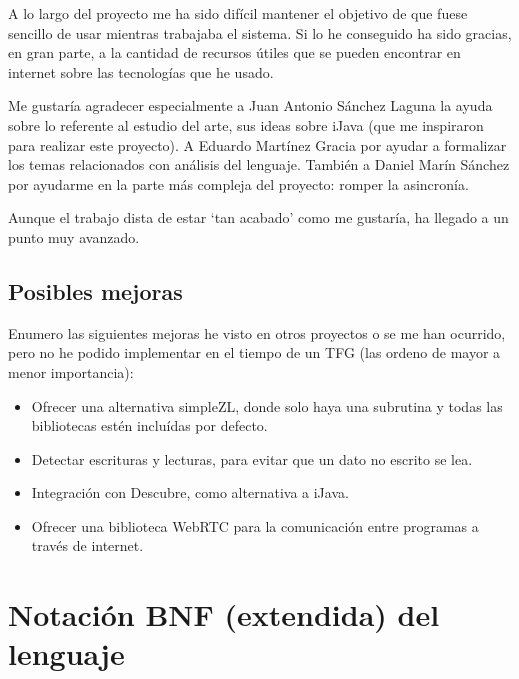 \documentclass{report}
\begin{document}
	\vspace{10px}
	
	A lo largo del proyecto me ha sido difícil mantener el objetivo de que fuese sencillo de usar mientras trabajaba el sistema. Si lo he conseguido ha sido gracias, en gran parte, a la cantidad de recursos útiles que se pueden encontrar en internet sobre las tecnologías que he usado.
	
	\vspace{10px}
	
	Me gustaría agradecer especialmente a Juan Antonio Sánchez Laguna la ayuda sobre lo referente al estudio del arte, sus ideas sobre iJava (que me inspiraron para realizar este proyecto). A Eduardo Martínez Gracia por ayudar a formalizar los temas relacionados con análisis del lenguaje. También a Daniel Marín Sánchez por ayudarme en la parte más compleja del proyecto: romper la asincronía.
	
	Aunque el trabajo dista de estar `tan acabado' como me gustaría, ha llegado a un punto muy avanzado.  
	
	\section{Posibles mejoras}
	
	Enumero las siguientes mejoras he visto en otros proyectos o se me han ocurrido, pero no he podido implementar en el tiempo de un TFG (las ordeno de mayor a menor importancia):
	
	\begin{itemize}
		\item Ofrecer una alternativa simpleZL, donde solo haya una subrutina y todas las bibliotecas estén incluídas por defecto.
		\item Detectar escrituras y lecturas, para evitar que un dato no escrito se lea.
		\item Integración con Descubre, como alternativa a iJava.
		\item Ofrecer una biblioteca WebRTC para la comunicación entre programas a través de internet.
		
	\end{itemize}
	
	
	
	

	\appendix
	\chapter{Notación BNF (extendida) del lenguaje} \label{app:a}
	
\end{document}
